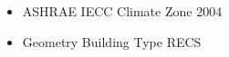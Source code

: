 \begin{itemize}
\item ASHRAE IECC Climate Zone 2004
\item Geometry Building Type RECS
\end{itemize}
